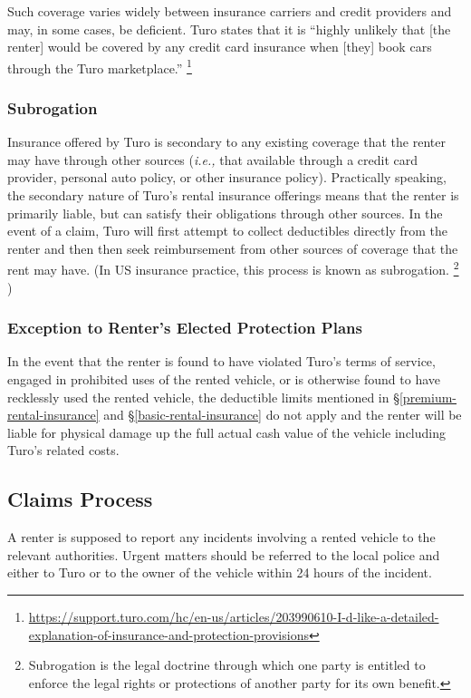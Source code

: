 \documentclass[review,12pt]{elsarticle}
\begin{document}
Such coverage varies widely between insurance carriers and credit providers and may, in some cases, be deficient. Turo states that it is ``highly unlikely that [the renter] would be covered by any credit card insurance when [they] book cars through the Turo marketplace.''
\footnote{\url{https://support.turo.com/hc/en-us/articles/203990610-I-d-like-a-detailed-explanation-of-insurance-and-protection-provisions}}

\subsubsection{Subrogation}
Insurance offered by Turo is secondary to any existing coverage that the renter may have through other sources (\emph{i.e.,} that available through a credit card provider, personal auto policy, or other insurance policy). Practically speaking, the secondary nature of Turo's rental insurance offerings means that the renter is primarily liable, but can satisfy their obligations through other sources. In the event of a claim, Turo will first attempt to collect deductibles directly from the renter and then then seek reimbursement from other sources of coverage that the rent may have. (In US insurance practice, this process is known as subrogation.
\footnote{Subrogation is the legal doctrine through which one party is entitled to enforce the legal rights or protections of another party for its own benefit.
}
)

\subsubsection{Exception to Renter's Elected Protection Plans}
In the event that the renter is found to have violated Turo's terms of service, engaged in prohibited uses of the rented vehicle, or is otherwise found to have recklessly used the rented vehicle, the deductible limits mentioned in \S\ref{premium-rental-insurance} and \S\ref{basic-rental-insurance} do not apply and the renter will be liable for physical damage up the full actual cash value of the vehicle including Turo's related costs.

\subsection{Claims Process}\label{claims-process}
A renter is supposed to report any incidents involving a rented vehicle to the relevant authorities. Urgent matters should be referred to the local police and either to Turo or to the owner of the vehicle within 24 hours of the incident.
\end{document}

